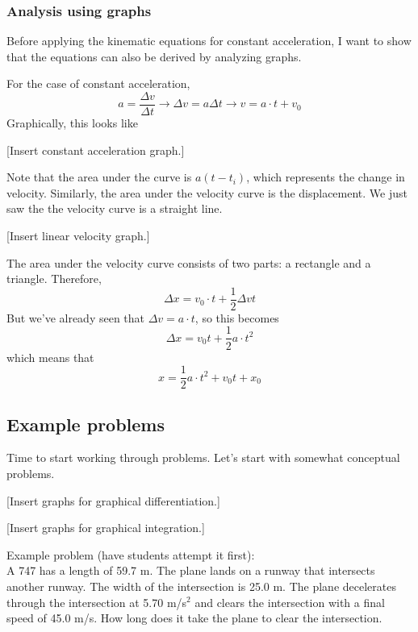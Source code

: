 \subsubsection{Analysis using graphs}
Before applying the kinematic equations for constant acceleration, I want to show that the equations can also be derived by analyzing graphs.

For the case of constant acceleration,
$$a=\frac{\Delta{v}}{\Delta{t}}\rightarrow \Delta{v}=a\Delta{t} \rightarrow \boxed{v=a\cdot{t}+v_0}$$
Graphically, this looks like

[Insert constant acceleration graph.]
\vspace{5cm}

Note that the area under the curve is $a(t-t_i)$, which represents the change in velocity. Similarly, the area under the velocity curve is the displacement. We just saw the the velocity curve is a straight line. 

[Insert linear velocity graph.]
\vspace{5cm}

The area under the velocity curve consists of two parts: a rectangle and a triangle. Therefore,
$$\Delta{x}=v_0\cdot{t}+\frac{1}{2}\Delta{v}{t}$$
But we've already seen that $\Delta{v}=a\cdot{t}$, so this becomes
$$\Delta{x}=v_0t+\frac{1}{2}a\cdot t^2$$
which means that
$$\boxed{x=\frac{1}{2}a\cdot t^2+v_0t+x_0}$$

\subsection{Example problems}
Time to start working through problems. Let's start with somewhat conceptual problems.

[Insert graphs for graphical differentiation.]

[Insert graphs for graphical integration.]


\clearpage
Example problem (have students attempt it first):\\
A 747 has a length of 59.7 m. The plane lands on a runway that intersects another runway. The width of the intersection is 25.0 m. The plane decelerates through the intersection at 5.70 m/s$^2$ and clears the intersection with a final speed of 45.0 m/s. How long does it take the plane to clear the intersection.

